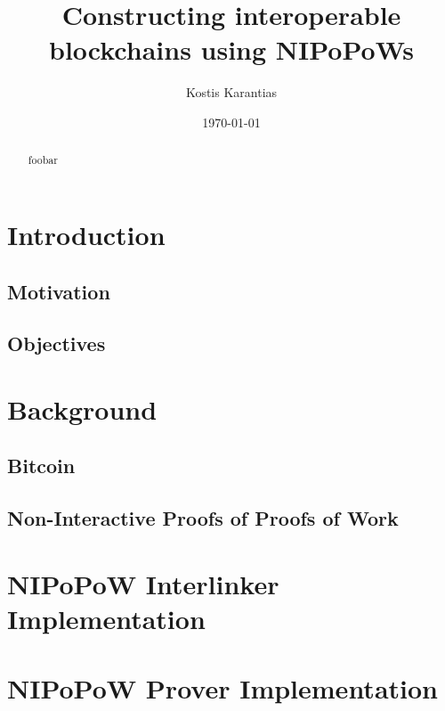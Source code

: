 \documentclass[11pt]{llncs}
\begin{document}
\title{Constructing interoperable blockchains using NIPoPoWs}
\date{\today}
\author{Kostis Karantias\\
    }
\maketitle
\noindent
\makebox[\linewidth]{\small \today}

\newpage

\begin{abstract}
    foobar
\end{abstract}

\newpage

\tableofcontents

\newpage

\thispagestyle{plain}

\section{Introduction}

\subsection{Motivation}
\subsection{Objectives}

\section{Background}

\subsection{Bitcoin}
\subsection{Non-Interactive Proofs of Proofs of Work}

\section{NIPoPoW Interlinker Implementation}
\section{NIPoPoW Prover Implementation}


\end{document}
